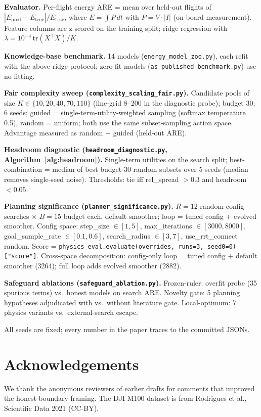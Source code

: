 \documentclass{article}
\begin{document}
\textbf{Evaluator.} Per-flight energy ARE = mean over held-out flights of
$|E_{\mathrm{pred}} - E_{\mathrm{true}}| / E_{\mathrm{true}}$, where $E = \int P\,dt$ with
$P = V\cdot|I|$ (on-board measurement). Feature columns are z-scored on the training
split; ridge regression with $\lambda = 10^{-4}\,\mathrm{tr}(X^\top X)/K$.

\textbf{Knowledge-base benchmark.} 14 models (\texttt{energy\_model\_zoo.py}), each refit
with the above ridge protocol; zero-fit models (\texttt{as\_published\_benchmark.py}) use
no fitting.

\textbf{Fair complexity sweep (\texttt{complexity\_scaling\_fair.py}).} Candidate pools of
size $K \in \{10,20,40,70,110\}$ (fine-grid 8--200 in the diagnostic probe); budget 30;
6 seeds; guided = single-term-utility-weighted sampling (softmax temperature 0.5),
random = uniform; both use the same subset-sampling action space. Advantage measured as
random $-$ guided (held-out ARE).

\textbf{Headroom diagnostic (\texttt{headroom\_diagnostic.py}, Algorithm~\ref{alg:headroom}).}
Single-term utilities on the search split; best-combination = median of best budget-30
random subsets over 5 seeds (median removes single-seed noise). Thresholds: tie iff
rel\_spread $> 0.3$ and headroom $< 0.05$.

\textbf{Planning significance (\texttt{planner\_significance.py}).} $R{=}12$ random
config searches $\times$ $B{=}15$ budget each, default smoother; loop = tuned config +
evolved smoother. Config space: step\_size $\in [1,5]$, max\_iterations $\in [3000,8000]$,
goal\_sample\_rate $\in [0.1,0.6]$, search\_radius $\in [3,7]$, use\_rrt\_connect random.
Score = \texttt{physics\_eval.evaluate(overrides, runs=3, seed0=0)["score"]}. Cross-space
decomposition: config-only loop = tuned config + default smoother (3264); full loop adds
evolved smoother (2882).

\textbf{Safeguard ablations (\texttt{safeguard\_ablation.py}).} Frozen-ruler: overfit probe
(35 spurious terms) vs.\ honest models on search ARE. Novelty gate: 5 planning hypotheses
adjudicated with vs.\ without literature gate. Local-optimum: 7 physics variants vs.\
external-search escape.

All seeds are fixed; every number in the paper traces to the committed JSONs.

\section*{Acknowledgements}
We thank the anonymous reviewers of earlier drafts for comments that improved the
honest-boundary framing. The DJI M100 dataset is from Rodrigues et al., Scientific
Data 2021 (CC-BY).
\end{document}
